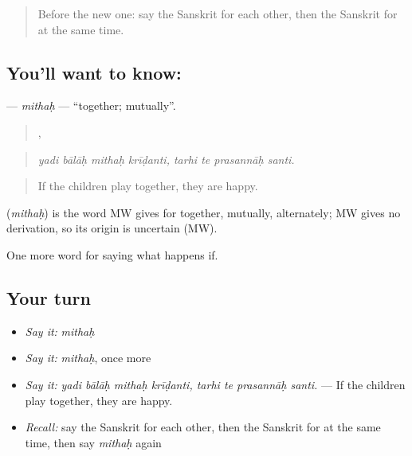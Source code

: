 \label{lesson:SA-C544-mithah}



\begin{quote}
Before the new one: say the Sanskrit for each other, then the Sanskrit for at the same time.
\end{quote}

\subsection*{You'll want to know: }
\textbf{} — \emph{mithaḥ} — \textquotedblleft{}together; mutually\textquotedblright{}.

\begin{quote}
   ,    
\end{quote}

\begin{quote}
\emph{yadi bālāḥ mithaḥ krīḍanti, tarhi te prasannāḥ santi.}
\end{quote}

\begin{quote}
If the children play together, they are happy.
\end{quote}

\begin{cousinweb}
\textbf{} (\emph{mithaḥ}) is the word MW gives for together, mutually, alternately; MW gives no derivation, so its origin is uncertain (MW).
\end{cousinweb}

\begin{grammarlens}[title={What you've built}]
One more word for saying what happens if.
\end{grammarlens}

\subsection*{Your turn}
\begin{itemize}
\raggedright
  \item \emph{Say it:} \emph{mithaḥ}
  \item \emph{Say it:} \emph{mithaḥ}, once more
  \item \emph{Say it:} \emph{yadi bālāḥ mithaḥ krīḍanti, tarhi te prasannāḥ santi.} — If the children play together, they are happy.
  \item \emph{Recall:} say the Sanskrit for each other, then the Sanskrit for at the same time, then say \emph{mithaḥ} again
\end{itemize}

